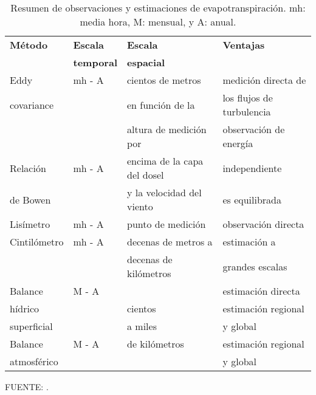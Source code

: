 \begin{table}[ht]
\caption{Resumen de observaciones y estimaciones de evapotranspiración. mh: media hora, M: mensual, y A: anual.}
\vspace{.2cm}
\label{tab:TableZhang01}
\centering
\begin{tabular}{l|l|l|l}
\hline
\textbf{Método} & \textbf{Escala}   & \textbf{Escala}             & \textbf{Ventajas}         \\
                & \textbf{temporal} & \textbf{espacial}           &                           \\ \hline
Eddy            & mh - A            & cientos de metros           & medición directa de       \\
covariance      &                   & en función de la            & los flujos de turbulencia \\
                &                   & altura de medición por      & observación de energía    \\ \cline{1-2}
Relación           & mh - A            & encima de la capa del dosel & independiente             \\
de Bowen        &                   & y la velocidad del viento   & es equilibrada            \\ \hline
Lisímetro       & mh - A            & punto de medición           & observación directa       \\ \cline{1-3}
Cintilómetro    & mh - A            & decenas de metros a         & estimación a              \\
                &                   & decenas de kilómetros       & grandes escalas           \\ \hline
Balance         & M - A             &                             & estimación directa        \\
hídrico         &                   & cientos                     & estimación regional       \\
superficial    &                   & a miles                     & y global                  \\ \cline{1-2} \cline{4-4} 
Balance         & M - A             & de kilómetros               & estimación regional       \\
atmosférico     &                   &                             & y global                  \\ \hline
\end{tabular}
\end{table}
\vspace*{-.5cm}
FUENTE: \citet{wang2012review}.

